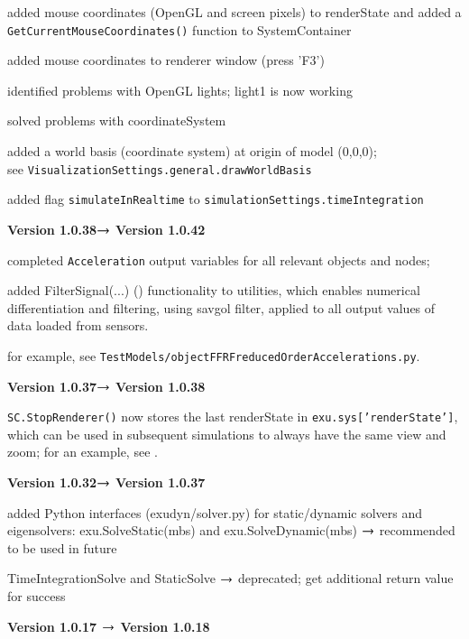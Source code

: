 	\item added mouse coordinates (OpenGL and screen pixels) to renderState and added a \texttt{GetCurrentMouseCoordinates()} function to SystemContainer
	\item added mouse coordinates to renderer window (press 'F3')
	\item identified problems with OpenGL lights; light1 is now working
	\item solved problems with coordinateSystem
	\item added a world basis (coordinate system) at origin of model (0,0,0); \\see \texttt{VisualizationSettings.general.drawWorldBasis}
	\item added flag \texttt{simulateInRealtime} to \texttt{simulationSettings.timeIntegration}
	\ei
	\item {\bf Version 1.0.38$\rightarrow$ Version 1.0.42}
	\bi
	\item completed \texttt{Acceleration} output variables for all relevant objects and nodes; 
	\item added FilterSignal(...) () functionality to utilities, which enables numerical differentiation and filtering, using savgol filter, applied to all output values of data loaded from sensors.
	\item for example, see \texttt{TestModels/objectFFRFreducedOrderAccelerations.py}.
	\ei
	\item {\bf Version 1.0.37$\rightarrow$ Version 1.0.38}
	\bi
	\item \texttt{SC.StopRenderer()} now stores the last renderState in \texttt{exu.sys['renderState']}, which can be used in subsequent simulations to always have the same view and zoom; 
	for an example, see .
	\ei
	\item {\bf Version 1.0.32$\rightarrow$ Version 1.0.37}
	\bi
	\item added Python interfaces (exudyn/solver.py) for static/dynamic solvers and eigensolvers: exu.SolveStatic(mbs) and exu.SolveDynamic(mbs) $\rightarrow$ recommended to be used in future
	\item TimeIntegrationSolve and StaticSolve $\rightarrow$ deprecated; get additional return value for success
	\ei
	\item {\bf Version 1.0.17 $\rightarrow$ Version 1.0.18}
